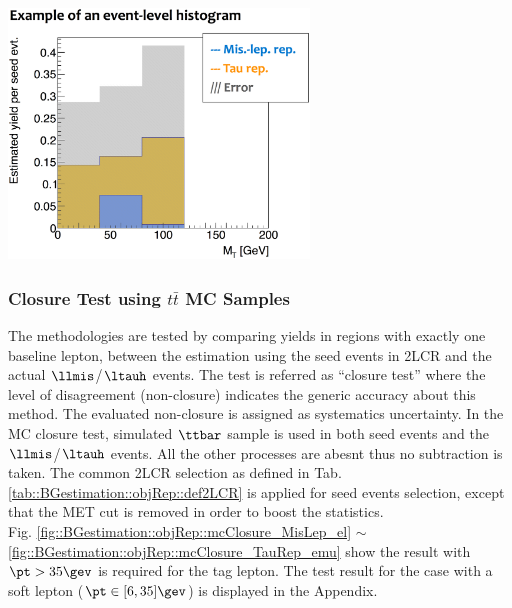 \begin{center}
\includegraphics[width=80mm]{figures/BGestimation/ObjReplacement/method/evtLevel_histogram.eps}
\label{fig::BGestimation::objRep::evtLevelHist}
\end{center}


\clearpage
\subsubsection{Closure Test using $t\bar{t}$ MC Samples} \label{sec::BGestimation::objRep::mcClosure} 
The methodologies are tested by comparing yields in regions with exactly one baseline lepton, between the estimation using the seed events in 2LCR and the actual $\llmis$/$\ltauh$ events. 
The test is referred as ``closure test'' where the level of disagreement (non-closure) indicates the generic accuracy about this method. The evaluated non-closure is assigned as systematics uncertainty. 
In the MC closure test, simulated $\ttbar$ sample is used in both seed events and the $\llmis$/$\ltauh$ events. All the other processes are abesnt thus no subtraction is taken.
The common 2LCR selection as defined in Tab. \ref{tab::BGestimation::objRep::def2LCR} is applied for seed events selection, except that the MET cut is removed in order to boost the statistics. \\

Fig. \ref{fig::BGestimation::objRep::mcClosure_MisLep_el} $\sim$ \ref{fig::BGestimation::objRep::mcClosure_TauRep_emu} show the result with $\pt>35\gev$ is required for the tag lepton. The test result for the case with a soft lepton ($\pt\in[6,35]\gev$) is displayed in the Appendix.

